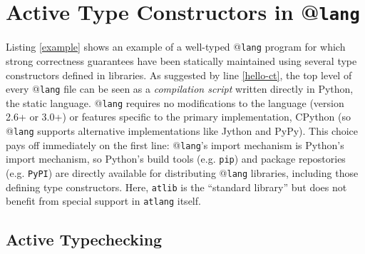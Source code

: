 \documentclass[9pt,preprint]{sigplanconf}
\newcommand{\lstinlinep}[1]{\lstinline[language=Python,basicstyle=\ttfamily\small]{#1}}
\begin{document}
\section{Active Type Constructors in @\texttt{lang}}\label{usage}



%
Listing \ref{example} shows an example of a well-typed @\texttt{lang} program for which strong correctness guarantees have been statically maintained using several type constructors defined in libraries. As suggested by line \ref{hello-ct}, the top level of every @\texttt{lang} file can be seen as a \emph{compilation script} written directly in Python, the static language. @\texttt{lang} requires no modifications to the language (version 2.6+ or 3.0+) or features specific to the primary implementation, CPython (so @\texttt{lang} supports alternative implementations like Jython and PyPy). This choice pays off immediately on the first line: @\texttt{lang}'s import mechanism is Python's import mechanism, so Python's build tools (e.g. \lstinlinep{pip}) and package repostories (e.g. \lstinlinep{PyPI}) are directly available for distributing @\texttt{lang} libraries, including those defining type constructors. Here, \lstinlinep{atlib} is the ``standard library'' but does not benefit from special support in \lstinlinep{atlang} itself.%

\subsection{Active Typechecking} 
\end{document}
